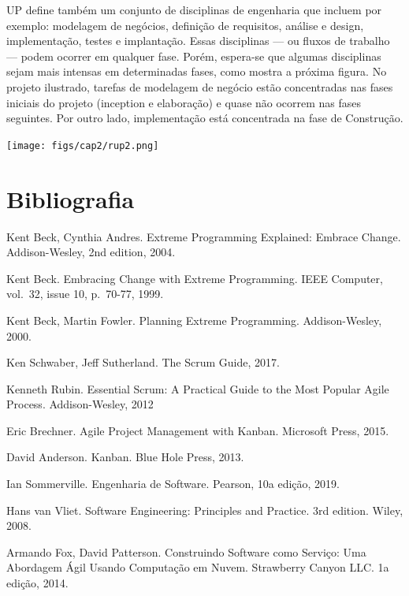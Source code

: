 \documentclass[
  11pt,
  twoside]{book}
\let\origfigure\figure
\let\endorigfigure\endfigure
\renewenvironment{figure}[1][2] {
    \expandafter\origfigure\expandafter[!h]
} {
    \endorigfigure
}
\begin{document}
UP define também um conjunto de disciplinas de engenharia que incluem
por exemplo: modelagem de negócios, definição de requisitos, análise e
design, implementação, testes e implantação. Essas disciplinas --- ou
fluxos de trabalho --- podem ocorrer em qualquer fase. Porém, espera-se
que algumas disciplinas sejam mais intensas em determinadas fases, como
mostra a próxima figura. No projeto ilustrado, tarefas de modelagem de
negócio estão concentradas nas fases iniciais do projeto (inception e
elaboração) e quase não ocorrem nas fases seguintes. Por outro lado,
implementação está concentrada na fase de Construção.

\begin{figure}
\centering
\texttt{[image: figs/cap2/rup2.png]}
\caption{Fases (na horizontal) e disciplinas (na vertical) de um projeto
desenvolvido usando UP. A área da curva mostra a intensidade da
disciplina durante cada fase (imagem da Wikipedia, licença: domínio
público).}
\end{figure}

\hypertarget{bibliografia-1}{%
\section*{Bibliografia}\label{bibliografia-1}}

Kent Beck, Cynthia Andres. Extreme Programming Explained: Embrace
Change. Addison-Wesley, 2nd edition, 2004.

Kent Beck. Embracing Change with Extreme Programming. IEEE Computer,
vol.~32, issue 10, p.~70-77, 1999.

Kent Beck, Martin Fowler. Planning Extreme Programming. Addison-Wesley,
2000.

Ken Schwaber, Jeff Sutherland. The Scrum Guide, 2017.

Kenneth Rubin. Essential Scrum: A Practical Guide to the Most Popular
Agile Process. Addison-Wesley, 2012

Eric Brechner. Agile Project Management with Kanban. Microsoft Press,
2015.

David Anderson. Kanban. Blue Hole Press, 2013.

Ian Sommerville. Engenharia de Software. Pearson, 10a edição, 2019.

Hans van Vliet. Software Engineering: Principles and Practice. 3rd
edition. Wiley, 2008.

Armando Fox, David Patterson. Construindo Software como Serviço: Uma
Abordagem Ágil Usando Computação em Nuvem. Strawberry Canyon LLC. 1a
edição, 2014.
\end{document}
